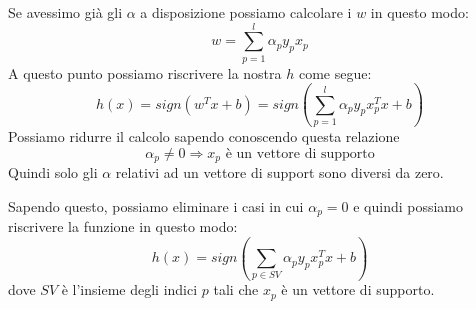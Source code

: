 Se avessimo gi\`a gli $\alpha$ a disposizione possiamo calcolare i $w$ in questo modo:
\[ w = \sum_{p=1}^l \alpha_p y_p x_p \]
A questo punto possiamo riscrivere la nostra $h$ come segue:
\[ h(x) = sign(w^T x + b) = sign \left( \sum_{p=1}^l \alpha_p y_p x_p^T x + b \right) \]
Possiamo ridurre il calcolo sapendo conoscendo questa relazione
\[ \alpha_p \neq 0 \Rightarrow x_p \text{ \`e un vettore di supporto} \]
Quindi solo gli $\alpha$ relativi ad un vettore di support sono diversi da zero.

Sapendo questo, possiamo eliminare i casi in cui $\alpha_p = 0$ e quindi possiamo riscrivere la funzione in questo modo:
\[ h(x) = sign \left( \sum_{p \in SV} \alpha_p y_p x_p^T x + b \right) \]
dove $SV$ \`e l'insieme degli indici $p$ tali che $x_p$ \`e un vettore di supporto.